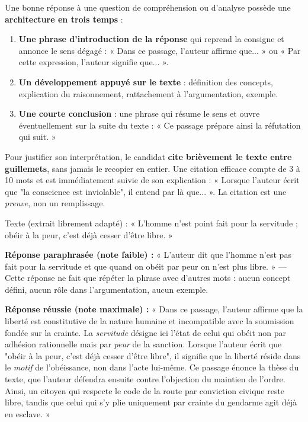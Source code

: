 \documentclass[11pt]{article}
\begin{document}
Une bonne réponse à une question de compréhension ou d'analyse possède une \textbf{architecture en trois temps} :

\begin{enumerate}
\item \textbf{Une phrase d'introduction de la réponse} qui reprend la consigne et annonce le sens dégagé : « Dans ce passage, l'auteur affirme que... » ou « Par cette expression, l'auteur signifie que... ».
\item \textbf{Un développement appuyé sur le texte} : définition des concepts, explication du raisonnement, rattachement à l'argumentation, exemple.
\item \textbf{Une courte conclusion} : une phrase qui résume le sens et ouvre éventuellement sur la suite du texte : « Ce passage prépare ainsi la réfutation qui suit. »
\end{enumerate}

\begin{propriete}
Pour justifier son interprétation, le candidat \textbf{cite brièvement le texte entre guillemets}, sans jamais le recopier en entier. Une citation efficace compte de 3 à 10 mots et est immédiatement suivie de son explication : « Lorsque l'auteur écrit que "la conscience est inviolable", il entend par là que... ». La citation est une \emph{preuve}, non un remplissage.
\end{propriete}

\begin{exemplebox}
Texte (extrait librement adapté) : « L'homme n'est point fait pour la servitude ; obéir à la peur, c'est déjà cesser d'être libre. »

\textbf{Réponse paraphrasée (note faible) :} « L'auteur dit que l'homme n'est pas fait pour la servitude et que quand on obéit par peur on n'est plus libre. » — Cette réponse ne fait que répéter la phrase avec d'autres mots : aucun concept défini, aucun rôle dans l'argumentation, aucun exemple.

\textbf{Réponse réussie (note maximale) :} « Dans ce passage, l'auteur affirme que la liberté est constitutive de la nature humaine et incompatible avec la soumission fondée sur la crainte. La \emph{servitude} désigne ici l'état de celui qui obéit non par adhésion rationnelle mais par \emph{peur} de la sanction. Lorsque l'auteur écrit que "obéir à la peur, c'est déjà cesser d'être libre", il signifie que la liberté réside dans le \emph{motif} de l'obéissance, non dans l'acte lui-même. Ce passage énonce la thèse du texte, que l'auteur défendra ensuite contre l'objection du maintien de l'ordre. Ainsi, un citoyen qui respecte le code de la route par conviction civique reste libre, tandis que celui qui s'y plie uniquement par crainte du gendarme agit déjà en esclave. »
\end{exemplebox}
\end{document}
